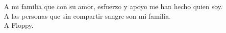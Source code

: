 \begin{dedication}
    A mi familia que con su amor, esfuerzo
    y apoyo me han hecho quien soy.\\

    A las personas que sin compartir
    sangre son mi familia.\\

    A Floppy.
\end{dedication}